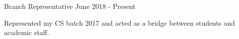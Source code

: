 

\begin{cventries}

  \projects
    {} %
    {Branch Representative} %
    {June 2018 - Present} %
    {} %
    {
      \begin{por} %
        \item []{Represented my CS batch 2017 and acted as a bridge between students and academic staff.}
      \end{por}
    }


\end{cventries}
